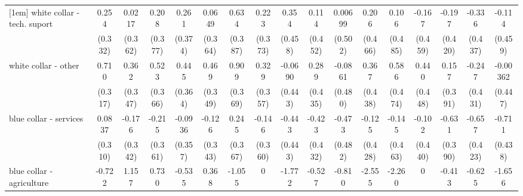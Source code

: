 {\begin{tabular}{l*{16}{c}}
[1em]
white collar - tech. suport&       0.254         &      0.0217         &       0.208         &       0.261         &      0.0649         &       0.634         &       0.223         &       0.354         &       0.114         &     0.00699         &       0.206         &       0.106         &      -0.167         &      -0.197         &      -0.336         &      -0.114         \\
                    &     (0.332)         &     (0.362)         &     (0.377)         &     (0.374)         &     (0.364)         &     (0.387)         &     (0.373)         &     (0.458)         &     (0.452)         &     (0.502)         &     (0.466)         &     (0.485)         &     (0.459)         &     (0.420)         &     (0.437)         &     (0.459)         \\
[1em]
white collar - other&       0.710\sym{*}  &       0.362         &       0.523         &       0.445         &       0.469         &       0.909\sym{*}  &       0.329         &     -0.0690         &       0.289         &     -0.0861         &       0.367         &       0.586         &       0.440         &       0.157         &      -0.247         &    -0.00362         \\
                    &     (0.317)         &     (0.347)         &     (0.366)         &     (0.364)         &     (0.349)         &     (0.369)         &     (0.357)         &     (0.443)         &     (0.435)         &     (0.480)         &     (0.438)         &     (0.474)         &     (0.448)         &     (0.391)         &     (0.431)         &     (0.447)         \\
[1em]
blue collar - services&      0.0837         &      -0.176         &      -0.215         &     -0.0936         &      -0.126         &       0.245         &      -0.146         &      -0.443         &      -0.423         &      -0.473         &      -0.125         &      -0.145         &      -0.102         &      -0.631         &      -0.657         &      -0.711         \\
                    &     (0.310)         &     (0.342)         &     (0.361)         &     (0.357)         &     (0.343)         &     (0.367)         &     (0.360)         &     (0.443)         &     (0.432)         &     (0.482)         &     (0.428)         &     (0.463)         &     (0.440)         &     (0.390)         &     (0.423)         &     (0.438)         \\
[1em]
blue collar - agriculture&      -0.722         &       1.157         &       0.730         &      -0.535         &       0.368         &      -1.055         &           0         &      -1.772         &      -0.527         &      -0.810         &      -2.555\sym{*}  &      -2.260         &           0         &      -0.413         &      -0.625         &      -1.656         \\

\end{tabular}}
